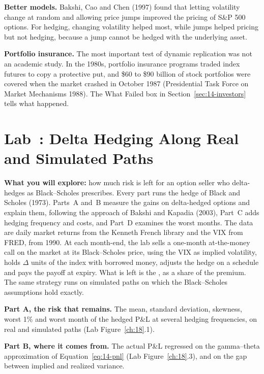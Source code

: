 \textbf{Better models.} Bakshi, Cao and Chen (1997) found that letting volatility change at random and allowing price jumps improved the pricing of S\&P 500 options. For hedging, changing volatility helped most, while jumps helped pricing but not hedging, because a jump cannot be hedged with the underlying asset.

\textbf{Portfolio insurance.} The most important test of dynamic replication was not an academic study. In the 1980s, portfolio insurance programs traded index futures to copy a protective put, and \$60 to \$90 billion of stock portfolios were covered when the market crashed in October 1987 (Presidential Task Force on Market Mechanisms 1988). The What Failed box in Section~\ref{sec:14-investors} tells what happened.

\section{Lab~\thechapter: Delta Hedging Along Real and Simulated Paths}
\label{sec:14-lab}

\textbf{What you will explore:} how much risk is left for an option seller who delta-hedges as Black--Scholes prescribes. Every part runs the hedge of Black and Scholes (1973). Parts~A and~B measure the gains on delta-hedged options and explain them, following the approach of Bakshi and Kapadia (2003), Part~C adds hedging frequency and costs, and Part~D examines the worst months. The data are daily market returns from the Kenneth French library and the VIX from FRED, from 1990. At each month-end, the lab sells a one-month at-the-money call on the market at its Black--Scholes price, using the VIX as implied volatility, holds $\Delta$ units of the index with borrowed money, adjusts the hedge on a schedule and pays the payoff at expiry. What is left is the , as a share of the premium. The same strategy runs on simulated paths on which the Black--Scholes assumptions hold exactly.

\textbf{Part A, the risk that remains.} The mean, standard deviation, skewness, worst 1\% and worst month of the hedged P\&L at several hedging frequencies, on real and simulated paths (Lab Figure~\ref{ch:18}.1).

\textbf{Part B, where it comes from.} The actual P\&L regressed on the gamma--theta approximation of Equation~\eqref{eq:14-pnl} (Lab Figure~\ref{ch:18}.3), and on the gap between implied and realized variance.

